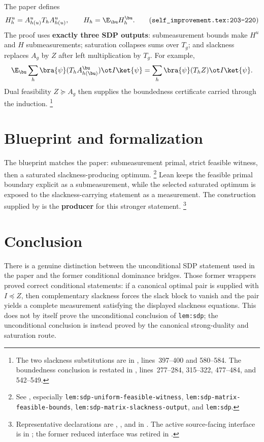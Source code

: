 \documentclass[11pt]{article}
\begin{document}
The paper defines
\[
  H^u_h=A^u_{h(u)}T_hA^u_{h(u)},
  \qquad
  H_h=\E_{\bu}H^{\bu}_h.
  \tag{\texttt{self\_improvement.tex:203--220}}
\]
The proof uses \textbf{exactly three SDP outputs}: submeasurement bounds make
$H^u$ and $H$ submeasurements; saturation collapses sums over $T_g$; and
slackness replaces $A_g$ by $Z$ after left multiplication by $T_g$.  For example,
\[
  \E_{\bu}\sum_h\bra{\psi}(T_hA^{\bu}_{h(\bu)})\ot I\ket{\psi}
  =\sum_h\bra{\psi}(T_hZ)\ot I\ket{\psi}.
\]
Dual feasibility $Z\succeq A_g$ then supplies the boundedness certificate carried
through the induction.%
\footnote{The two slackness substitutions are in
, lines~397--400 and 580--584.
The boundedness conclusion is restated in
, lines~277--284, 315--322,
477--484, and 542--549.}

\section{Blueprint and formalization}

The blueprint matches the paper: submeasurement primal, strict feasible witness,
then a saturated slackness-producing optimum.%
\footnote{See , especially
\texttt{lem:sdp-uniform-feasible-witness},
\texttt{lem:sdp-matrix-feasible-bounds},
\texttt{lem:sdp-matrix-slackness-output}, and \texttt{lem:sdp}.}
Lean keeps the feasible primal boundary explicit as a submeasurement, while the
selected saturated optimum is exposed to the slackness-carrying statement as a
measurement.  The construction supplied by  is the \textbf{producer}
for this stronger statement.%
\footnote{Representative declarations are ,
, and
 in
.  The active source-facing
interface is  in
; the former
reduced  interface was retired in .}

\section{Conclusion}

There is a genuine distinction between the unconditional SDP statement used in
the paper and the former conditional dominance bridges.  Those former wrappers
proved correct conditional statements: if a canonical optimal pair is supplied
with $I\preceq Z$, then complementary slackness forces the slack block to vanish
and the pair yields a complete measurement satisfying the displayed slackness
equations.  This does not by itself prove the unconditional conclusion of
\texttt{lem:sdp}; the unconditional conclusion is instead proved by the
canonical strong-duality and saturation route.
\end{document}
